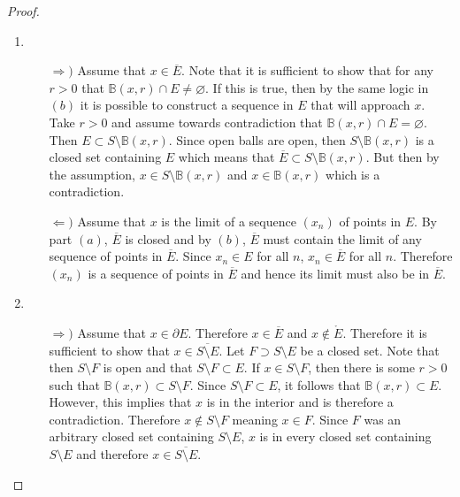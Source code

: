 \documentclass[../notes.tex]{subfiles}
\begin{document}
\begin{proof}
\begin{enumerate}
\begin{enumerate}
        \end{enumerate}
        \item 
        \begin{enumerate}
            \item[$\Rightarrow)$] %
                Assume that $x \in \overline{E}$. Note that it is sufficient to show that for any $r>0$ that $\mathbb{B}(x,r) \cap E \neq \varnothing$. If this is true, then by the same logic in $(b)$ it is possible to construct a sequence in $E$ that will approach $x$. Take $r > 0$ and assume towards contradiction that $\mathbb{B}(x,r) \cap E = \varnothing$. Then $E \subset S \setminus \mathbb{B}(x,r)$. Since open balls are open, then $S \setminus \mathbb{B}(x,r)$ is a closed set containing $E$ which means that $\overline{E} \subset S \setminus \mathbb{B}(x,r)$. But then by the assumption, $x \in S \setminus \mathbb{B}(x,r)$ and $x \in \mathbb{B}(x,r)$ which is a contradiction.
            \item[$\Leftarrow)$] %
                Assume that $x$ is the limit of a sequence $(x_n)$ of points in $E$. By part $(a)$, $\overline{E}$ is closed and by $(b)$, $\overline{E}$ must contain the limit of any sequence of points in $\overline{E}$. Since $x_n \in E$ for all $n$, $x_n \in \overline{E}$ for all $n$. Therefore $(x_n)$ is a sequence of points in $\overline{E}$ and hence its limit must also be in $\overline{E}$.
        \end{enumerate}
        \item
        \begin{enumerate}
            \item[$\Rightarrow)$] %
                Assume that $x \in \partial E$. Therefore $x \in \overline{E}$ and $x \notin \mathring{E}$. Therefore it is sufficient to show that $x \in \overline{S \setminus E}$. Let $F \supset S \setminus E$ be a closed set. Note that then $S \setminus F$ is open and that $S \setminus F \subset E$. If $x \in S \setminus F$, then there is some $r > 0$ such that $\mathbb{B}(x,r) \subset S \setminus F$. Since $S \setminus F \subset E$, it follows that $\mathbb{B}(x,r) \subset E$. However, this implies that $x$ is in the interior and is therefore a contradiction. Therefore $x \notin S \setminus F$ meaning $x \in F$. Since $F$ was an arbitrary closed set containing $S \setminus E$, $x$ is in every closed set containing $S \setminus E$ and therefore $x \in \overline{S \setminus E}$.

\end{enumerate}
\end{enumerate}
\end{proof}
\end{document}
